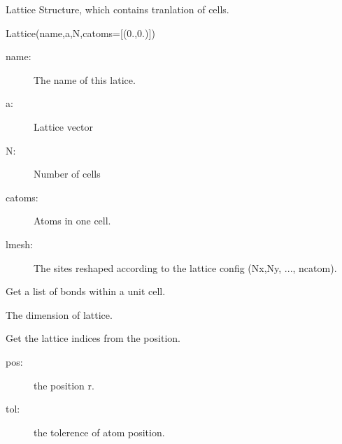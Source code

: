 \documentclass[letterpaper,10pt,oneside,openany]{sphinxmanual}
\begin{document}
\begin{fulllineitems}
\label{index:lattice.lattice.Lattice}
Lattice Structure, which contains tranlation of cells.

Lattice(name,a,N,catoms={[}(0.,0.){]})
\begin{description}
\item[{name:}] \leavevmode
The name of this latice.

\item[{a:}] \leavevmode
Lattice vector

\item[{N: }] \leavevmode
Number of cells

\item[{catoms:}] \leavevmode
Atoms in one cell.

\item[{lmesh:}] \leavevmode
The sites reshaped according to the lattice config (Nx,Ny, ..., ncatom).

\end{description}

\begin{fulllineitems}
\label{index:lattice.lattice.Lattice.cbonds}
Get a list of bonds within a unit cell.

\end{fulllineitems}


\begin{fulllineitems}
\label{index:lattice.lattice.Lattice.dimension}
The dimension of lattice.

\end{fulllineitems}


\begin{fulllineitems}
\label{index:lattice.lattice.Lattice.findsite}
Get the lattice indices from the position.
\begin{description}
\item[{pos: }] \leavevmode
the position r.

\item[{tol:}] \leavevmode
the tolerence of atom position.


\end{description}
\end{fulllineitems}
\end{fulllineitems}
\end{document}

